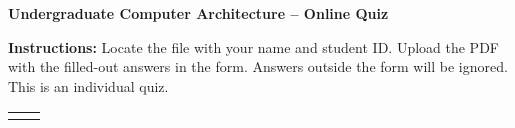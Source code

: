 \noindent\begin{minipage}{\textwidth} %
\centering 
\Large \bf Undergraduate Computer Architecture -- Online Quiz \testn
\end{minipage}

\noindent\hrulefill






\noindent \textbf{Instructions:} Locate the file with your name and student ID. Upload the PDF with the filled-out answers in the form. Answers outside the form will be ignored. This is an individual quiz.%

\noindent\hrulefill

\vspace{.2cm}

\noindent\begin{tabular}{lr}
 \namefield{\fbox{
    \begin{minipage}{.7\linewidth}
      Name:

      \Large\bf \name{} \surname{}

      \vspace*{1mm}
    \end{minipage}
  }} & %
  \fbox{
     \begin{minipage}{.2\linewidth}
       ID:

       \Large\bf \id{}

       \vspace*{1mm}
     \end{minipage}
   }
\end{tabular}

\vspace{.2cm}

\noindent\hrulefill

